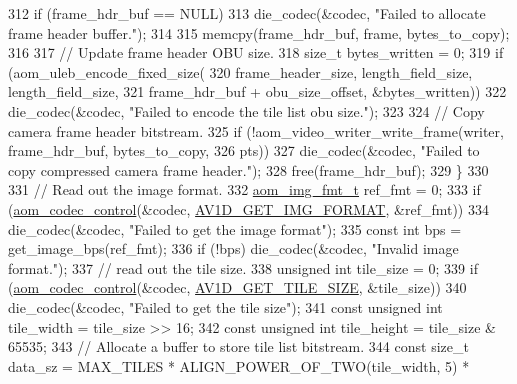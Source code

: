 \begin{DoxyCodeInclude}
{{{{{{312     \textcolor{keywordflow}{if} (frame\_hdr\_buf == NULL)
313       die\_codec(&codec, \textcolor{stringliteral}{"Failed to allocate frame header buffer."});
314 
315     memcpy(frame\_hdr\_buf, frame, bytes\_to\_copy);
316 
317     \textcolor{comment}{// Update frame header OBU size.}
318     \textcolor{keywordtype}{size\_t} bytes\_written = 0;
319     \textcolor{keywordflow}{if} (aom\_uleb\_encode\_fixed\_size(
320             frame\_header\_size, length\_field\_size, length\_field\_size,
321             frame\_hdr\_buf + obu\_size\_offset, &bytes\_written))
322       die\_codec(&codec, \textcolor{stringliteral}{"Failed to encode the tile list obu size."});
323 
324     \textcolor{comment}{// Copy camera frame header bitstream.}
325     \textcolor{keywordflow}{if} (!aom\_video\_writer\_write\_frame(writer, frame\_hdr\_buf, bytes\_to\_copy,
326                                       pts))
327       die\_codec(&codec, \textcolor{stringliteral}{"Failed to copy compressed camera frame header."});
328     free(frame\_hdr\_buf);
329   \}
330 
331   \textcolor{comment}{// Read out the image format.}
332   \hyperlink{aom__image_8h_ab71efff8c7f49380fad23b93bc2e9bfc}{aom\_img\_fmt\_t} ref\_fmt = 0;
333   \textcolor{keywordflow}{if} (\hyperlink{group__codec_ga6da974f4eeaba1fa74106b28d0fe6ac5}{aom\_codec\_control}(&codec, \hyperlink{group__aom__decoder_gga3865fd4b3192489baa9a5c3632ebe97bacd7229e5fb766670fe995739931c2ee3}{AV1D\_GET\_IMG\_FORMAT}, &ref\_fmt))
334     die\_codec(&codec, \textcolor{stringliteral}{"Failed to get the image format"});
335   \textcolor{keyword}{const} \textcolor{keywordtype}{int} bps = get\_image\_bps(ref\_fmt);
336   \textcolor{keywordflow}{if} (!bps) die\_codec(&codec, \textcolor{stringliteral}{"Invalid image format."});
337   \textcolor{comment}{// read out the tile size.}
338   \textcolor{keywordtype}{unsigned} \textcolor{keywordtype}{int} tile\_size = 0;
339   \textcolor{keywordflow}{if} (\hyperlink{group__codec_ga6da974f4eeaba1fa74106b28d0fe6ac5}{aom\_codec\_control}(&codec, \hyperlink{group__aom__decoder_gga3865fd4b3192489baa9a5c3632ebe97ba4d9799d9e520785870b8d1f73a19c3c4}{AV1D\_GET\_TILE\_SIZE}, &tile\_size))
340     die\_codec(&codec, \textcolor{stringliteral}{"Failed to get the tile size"});
341   \textcolor{keyword}{const} \textcolor{keywordtype}{unsigned} \textcolor{keywordtype}{int} tile\_width = tile\_size >> 16;
342   \textcolor{keyword}{const} \textcolor{keywordtype}{unsigned} \textcolor{keywordtype}{int} tile\_height = tile\_size & 65535;
343   \textcolor{comment}{// Allocate a buffer to store tile list bitstream.}
344   \textcolor{keyword}{const} \textcolor{keywordtype}{size\_t} data\_sz = MAX\_TILES * ALIGN\_POWER\_OF\_TWO(tile\_width, 5) *
}}}}}}
\end{DoxyCodeInclude}
